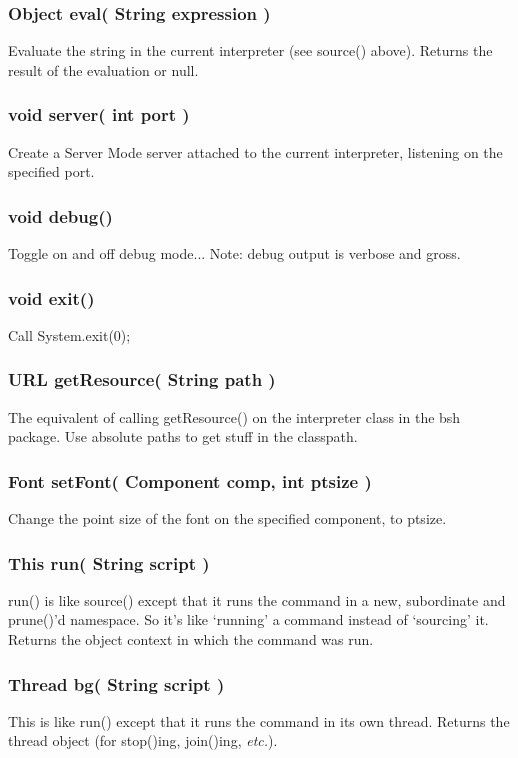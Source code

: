 \documentclass[twoside,11pt,nolof]{starlink}
\providecommand{\etc}{\textit{etc.}}
\begin{document}
\subsubsection*{Object eval( String expression )}
Evaluate the string in the current interpreter (see source() above).
Returns the result of the evaluation or null.

\subsubsection*{void server( int port )}
Create a Server Mode server attached to the current interpreter,
listening on the specified port.

\subsubsection*{void debug()}
Toggle on and off debug mode... Note: debug output is verbose and gross.

\subsubsection*{void exit()}
Call System.exit(0);

\subsubsection*{URL getResource( String path )}
The equivalent of calling getResource() on the interpreter class in
the bsh package.  Use absolute paths to get stuff in the classpath.

\subsubsection*{Font setFont( Component comp, int ptsize )}
Change the point size of the font on the specified component, to ptsize.

\subsubsection*{This run( String script )}
run() is like source() except that it runs the command in a new,
subordinate and prune()'d namespace.  So it's like `running' a command
instead of `sourcing' it.  Returns the object context in which the command
was run.

\subsubsection*{Thread bg( String script )}
This is like run() except that it runs the command in its own thread.
Returns the thread object (for stop()ing, join()ing, \etc).
\end{document}
